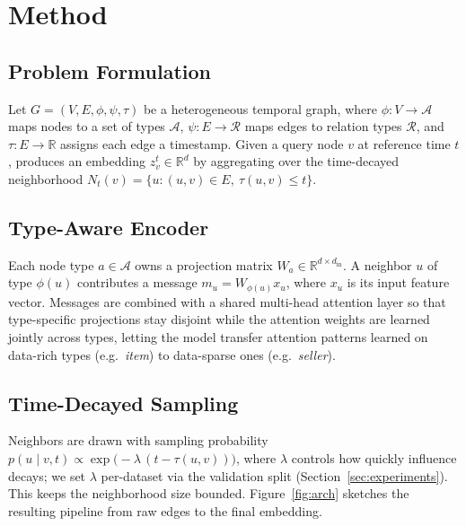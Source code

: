 \section{Method}
\label{sec:method}
\subsection{Problem Formulation}
Let $G = (V, E, \phi, \psi, \tau)$ be a heterogeneous temporal graph, where
$\phi: V \to \mathcal{A}$ maps nodes to a set of types $\mathcal{A}$,
$\psi: E \to \mathcal{R}$ maps edges to relation types $\mathcal{R}$, and
$\tau: E \to \mathbb{R}$ assigns each edge a timestamp. Given a query node
$v$ at reference time $t$, \sysname{} produces an embedding
$z_v^t \in \mathbb{R}^d$ by aggregating over the time-decayed neighborhood
$N_t(v) = \{u : (u,v) \in E,\ \tau(u,v) \le t\}$.

\subsection{Type-Aware Encoder}
Each node type $a \in \mathcal{A}$ owns a projection matrix
$W_a \in \mathbb{R}^{d \times d_{\text{in}}}$. A neighbor $u$ of type
$\phi(u)$ contributes a message $m_u = W_{\phi(u)} x_u$, where $x_u$ is its
input feature vector. Messages are combined with a shared multi-head
attention layer so that type-specific projections stay disjoint while the
attention weights are learned jointly across types, letting the model
transfer attention patterns learned on data-rich types (e.g.\ \emph{item})
to data-sparse ones (e.g.\ \emph{seller}).

\subsection{Time-Decayed Sampling}
Neighbors are drawn with sampling probability
$p(u \mid v, t) \propto \exp\!\big(-\lambda\,(t - \tau(u,v))\big)$,
where $\lambda$ controls how quickly influence decays; we set $\lambda$
per-dataset via the validation split (Section~\ref{sec:experiments}). This
keeps the neighborhood size bounded. Figure~\ref{fig:arch} sketches the
resulting pipeline from raw edges to the final embedding.

